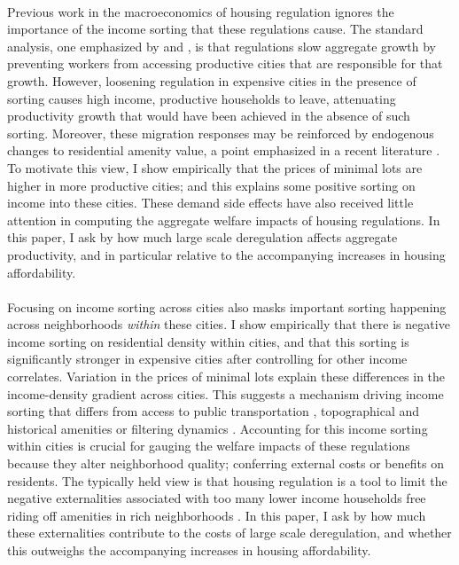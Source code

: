 \documentclass[12pt]{article}
\begin{document}
	\paragraph*{}
	Previous work in the macroeconomics of housing regulation ignores the importance of the income sorting that these regulations cause. The standard analysis, one emphasized by \cite{hseihmoretti} and \cite{durantonpugaurbgrowth}, is that regulations slow aggregate growth by preventing workers from accessing productive cities that are responsible for that growth. However, loosening regulation in expensive cities in the presence of sorting causes high income, productive households to leave, attenuating productivity growth that would have been achieved in the absence of such sorting. Moreover, these migration responses may be reinforced by endogenous changes to residential amenity value, a point emphasized in a recent literature \citep{diamond2016, AlmagroDI}. To motivate this view, I show empirically that the prices of minimal lots are higher in more productive cities; and this explains some positive sorting on income into these cities. These demand side effects have also received little attention in computing the aggregate welfare impacts of housing regulations. In this paper, I ask by how much large scale deregulation affects aggregate productivity, and in particular relative to the accompanying increases in housing affordability. 
	  
	
	\paragraph*{} 
	Focusing on income sorting across cities also masks important sorting happening across neighborhoods \textit{within} these cities. I show empirically that there is negative income sorting on residential density within cities, and that this sorting is significantly stronger in expensive cities after controlling for other income correlates. Variation in the prices of minimal lots explain these differences in the income-density gradient across cities. This suggests a mechanism driving income sorting that differs from access to public transportation \citep{ccpoortransport}, topographical and historical amenities \citep{parispoor} or filtering dynamics \citep{Gentrificationcycles}. Accounting for this income sorting within cities is crucial for gauging the welfare impacts of these regulations because they alter neighborhood quality; conferring external costs or benefits on residents. The typically held view is that housing regulation is a tool to limit the negative externalities associated with too many lower income households free riding off amenities in rich neighborhoods \citep{calabresetal, Hamilton1975}. In this paper, I ask by how much these externalities contribute to the costs of large scale deregulation, and whether this outweighs the accompanying increases in housing affordability.  
		
\end{document}
